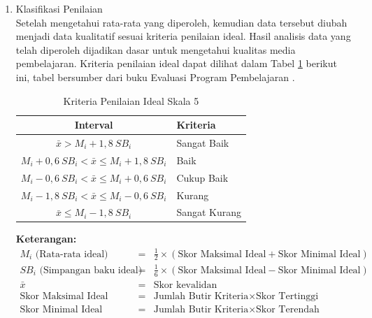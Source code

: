 \begin{enumerate}
\begin{enumerate}

        \item Klasifikasi Penilaian\\
        \hspace*{1cm}Setelah mengetahui rata-rata yang diperoleh, kemudian data tersebut diubah menjadi data kualitatif sesuai kriteria penilaian ideal. Hasil analisis data yang telah diperoleh dijadikan dasar untuk mengetahui kualitas media pembelajaran. Kriteria penilaian ideal dapat dilihat dalam Tabel \ref{kriteriaskala5} berikut ini, tabel bersumber dari buku Evaluasi Program Pembelajaran \citep{widoyoko2014}.
        \begin{table}[H]
            \centering
            \caption{Kriteria Penilaian Ideal Skala 5}
            \label{kriteriaskala5}
            \begin{tabular}{|c|p{3cm}|}
                \hline
                \textbf{Interval} & \textbf{Kriteria}\\
                \hline
                \( \bar{x} > M_i + 1{,}8~SB_i \) & Sangat Baik\\
                \( M_i + 0{,}6~SB_i < \bar{x} \leq M_i + 1{,}8~SB_i \) & Baik\\
                \( M_i - 0{,}6~SB_i < \bar{x} \leq M_i + 0{,}6~SB_i  \) & Cukup Baik\\
                \( M_i - 1{,}8~SB_i < \bar{x} \leq M_i - 0{,}6~SB_i \) & Kurang\\
                \( \bar{x} \leq M_i - 1{,}8~SB_i \) & Sangat Kurang\\
                \hline
            \end{tabular}
        \end{table}
        \textbf{Keterangan:}\\
        \( \begin{array}{lcl}
            M_i \text{ (Rata-rata ideal)} & = & \frac{1}{2} \times (\text{Skor Maksimal Ideal} + \text{Skor Minimal Ideal})\\
            SB_i \text{ (Simpangan baku ideal)} & = & \frac{1}{6} \times (\text{Skor Maksimal Ideal} - \text{Skor Minimal Ideal})\\
            \bar{x} & = & \text{Skor kevalidan}\\
            \text{Skor Maksimal Ideal} & = & \text{Jumlah Butir Kriteria} \times \text{Skor Tertinggi}\\
            \text{Skor Minimal Ideal} & = & \text{Jumlah Butir Kriteria} \times \text{Skor Terendah}
        \end{array} \)


\end{enumerate}
\end{enumerate}
